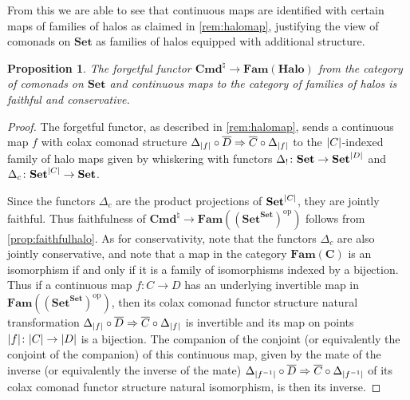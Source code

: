 \documentclass[11pt, oneside, article]{memoir}
\theoremstyle{plain}
\newtheorem{proposition}[theorem]{Proposition}
\theoremstyle{definition}
\theoremstyle{remark}
\DeclareMathOperator{\ophelper}{op}
\DeclarePairedDelimiter{\abs}{\lvert}{\rvert}
\newcommand{\op}{^{\ophelper}}
\newcommand{\bang}{\mathrm{!}}
\newcommand{\namedcat}[1]{\mathbf{#1}}
\newcommand{\cat}[1]{\mathbf{#1}}
\newcommand{\Halo}{\namedcat{Halo}}
\newcommand{\Set}{\namedcat{Set}}
\newcommand{\Con}{\namedcat{Cmd}^\natural}
\newcommand{\ConSet}{\Con}
\newcommand{\Fam}{\mathbf{Fam}}
\newcommand{\clift}[1]{\overline{#1}}
\newcommand{\pts}[1]{{\abs{#1}}}
\newcommand{\one}[1]{\pts{#1}}
\newcommand{\reindex}[1]{\Delta_{#1}}
\newcommand{\slicer}{\Delta_\bang}
\newcommand{\fun}[2]{{#2}^{#1}}
\newcommand{\End}[1]{\fun{#1}{#1}}
\newcommand{\SetSet}{\End{\Set}}
\newcommand{\cmnd}[1]{{#1}}
\newcommand{\cC}{\cmnd{C}}
\newcommand{\cD}{\cmnd{D}}
\newcommand{\bC}{\cat{C}}
\newcommand{\SetpC}{\Set^\pts{\cC}}
\newcommand{\SetpD}{\Set^\pts{\cD}}
\begin{document}
From this we are able to see that continuous maps are identified with
certain maps of families of halos as claimed in \cref{rem:halomap}, justifying the view of comonads on
$\Set$ as families of halos equipped with additional structure.

\begin{proposition}\label{prop:continuoushalo}
  The forgetful functor $\ConSet \to \Fam(\Halo)$ from the
  category of comonads on $\Set$ and continuous maps to the category
  of families of halos is faithful and conservative.
\end{proposition}
\begin{proof}
  The forgetful functor, as described in \cref{rem:halomap}, sends a
  continuous map $f$ with colax comonad structure
  $\reindex{\one{f}} \circ \clift{\cD} \Rightarrow \clift{\cC} \circ
  \reindex{\one{f}}$ to the $\pts{\cC}$-indexed family of halo maps
  given by whiskering with functors $\slicer \colon \Set \to \SetpD$
  and $\reindex{c} \colon \SetpC \to \Set$.
  
  Since the functors $\reindex{c}$ are the product projections of
  $\SetpC$, they are jointly faithful. Thus faithfulness of
  $\ConSet \to \Fam((\SetSet)\op)$ follows from
  \cref{prop:faithfulhalo}. As for conservativity, note that the
  functors $\reindex{c}$ are also jointly conservative, and note that
  a map in the category $\Fam(\bC)$ is an isomorphism if and only if
  it is a family of isomorphisms indexed by a bijection. Thus if a
  continuous map $f \colon \cC \to \cD$ has an underlying invertible
  map in $\Fam((\SetSet)\op)$, then its colax comonad functor
  structure natural transformation
  $\reindex{\one{f}} \circ \clift{\cD} \Rightarrow \clift{\cC} \circ
  \reindex{\one{f}}$ is invertible and its map on points
  $\one{f} \colon \pts{\cC} \to \pts{\cD}$ is a bijection. The
  companion of the conjoint (or equivalently the conjoint of the
  companion) of this continuous map, given by the mate of the inverse
  (or equivalently the inverse of the mate)
  $\reindex{\one{f^{-1}}} \circ \clift{\cD} \Rightarrow \clift{\cC}
  \circ \reindex{\one{f^{-1}}}$ of its colax comonad functor structure
  natural isomorphism, is then its inverse.
\end{proof}
\end{document}
